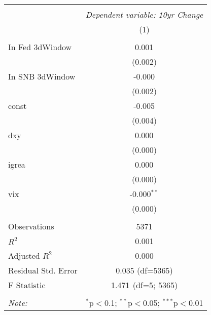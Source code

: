 \begin{table}[!htbp] \centering
\begin{tabular}{@{\extracolsep{5pt}}lc}
\\[-1.8ex]\hline
\hline \\[-1.8ex]
& \multicolumn{1}{c}{\textit{Dependent variable: 10yr Change}} \
\cr \cline{2-2}
\\[-1.8ex] & (1) \\
\hline \\[-1.8ex]
 In Fed 3dWindow & 0.001$^{}$ \\
& (0.002) \\
 In SNB 3dWindow & -0.000$^{}$ \\
& (0.002) \\
 const & -0.005$^{}$ \\
& (0.004) \\
 dxy & 0.000$^{}$ \\
& (0.000) \\
 igrea & 0.000$^{}$ \\
& (0.000) \\
 vix & -0.000$^{**}$ \\
& (0.000) \\
\hline \\[-1.8ex]
 Observations & 5371 \\
 $R^2$ & 0.001 \\
 Adjusted $R^2$ & 0.000 \\
 Residual Std. Error & 0.035 (df=5365) \\
 F Statistic & 1.471$^{}$ (df=5; 5365) \\
\hline
\hline \\[-1.8ex]
\textit{Note:} & \multicolumn{1}{r}{$^{*}$p$<$0.1; $^{**}$p$<$0.05; $^{***}$p$<$0.01} \\
\end{tabular}
\end{table}